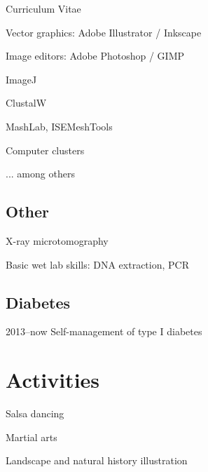 \documentclass[11pt,a4paper]{article}
\begin{document}
\begin{cv}{Curriculum Vitae}
		\begin{cvlist}{}
			
			\item Vector graphics: Adobe Illustrator / Inkscape
			\item Image editors: Adobe Photoshop / GIMP
			\item ImageJ
			\item ClustalW
			\item MashLab, ISEMeshTools
			\item Computer clusters
			\item ... among others
			
		\end{cvlist}
		
		\subsection{Other}
		
		\begin{cvlist}{}
			
			\item X-ray microtomography
			\item Basic wet lab skills: DNA extraction, PCR
			
		\end{cvlist}
	
		\subsection{Diabetes}
		
		\begin{cvlist}{}
			
			\item[2013--now] Self-management of type I diabetes
			
		\end{cvlist}
	
		\section{Activities}
		
		\begin{cvlist}{}
			
			\item Salsa dancing
			
			\item Martial arts
			
			\item Landscape and natural history illustration
			

\end{cvlist}
\end{cv}
\end{document}
